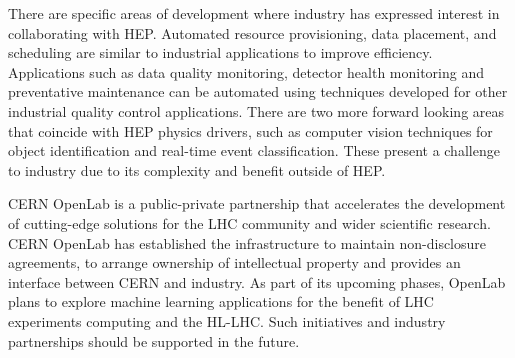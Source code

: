There are specific areas of development where industry has expressed interest in collaborating with HEP.  Automated resource provisioning, data placement, and scheduling are similar to industrial applications to improve efficiency. Applications such as data quality monitoring, detector health monitoring and preventative maintenance can be automated using techniques developed for other industrial quality control applications. There are two more forward looking areas that coincide with HEP physics drivers, such as computer vision techniques for object identification and real-time event classification. These present a challenge to industry due to its complexity and benefit outside of HEP.



CERN OpenLab is a public-private partnership that accelerates the development of cutting-edge solutions for the LHC community and wider scientific research. CERN OpenLab has established the infrastructure to maintain non-disclosure agreements, to arrange ownership of intellectual property and provides an interface between CERN and industry. As part of its upcoming phases, OpenLab plans to explore machine learning applications for the benefit of LHC experiments computing and the HL-LHC. Such initiatives and industry partnerships should be supported in the future.



